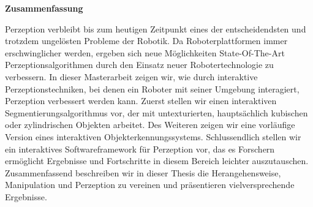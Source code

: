 
\clearemptydoublepage
{}
{}

\vspace*{1cm}
\begin{center}
{\Large \bf Zusammenfassung}
\end{center}
\vspace{1cm}



Perzeption verbleibt bis zum heutigen Zeitpunkt eines der entscheidendsten und trotzdem ungel{\"o}sten Probleme der Robotik.
Da Roboterplattformen immer erschwinglicher werden, ergeben sich neue M{\"o}glichkeiten State-Of-The-Art Perzeptionsalgorithmen
durch den Einsatz neuer Robotertechnologie zu verbessern.
In dieser Masterarbeit zeigen wir, wie durch interaktive Perzeptionstechniken, bei denen ein Roboter mit seiner Umgebung interagiert,
Perzeption verbessert werden kann.
Zuerst stellen wir einen interaktiven Segmentierungsalgorithmus vor, der mit untexturierten,
haupts{\"a}chlich kubischen oder zylindrischen Objekten arbeitet.
Des Weiteren zeigen wir eine vorl{\"a}ufige Version eines interaktiven Objekterkennungssystems.
Schlussendlich stellen wir ein interaktives Softwareframework f{\"u}r Perzeption vor,
das es Forschern erm{\"o}glicht Ergebnisse und Fortschritte in diesem Bereich leichter auszutauschen.
Zusammenfassend beschreiben wir in dieser Thesis die Herangehensweise, Manipulation und
Perzeption zu vereinen und pr{\"a}sentieren vielversprechende Ergebnisse.


